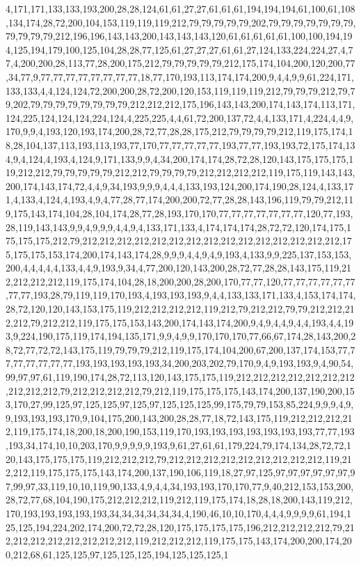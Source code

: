 4,171,171,133,133,193,200,28,28,124,61,61,27,27,61,61,61,194,194,194,61,100,61,108,134,174,28,72,200,104,153,119,119,119,212,79,79,79,79,79,202,79,79,79,79,79,79,79,79,79,79,79,212,196,196,143,143,200,143,143,143,120,61,61,61,61,61,100,100,194,194,125,194,179,100,125,104,28,28,77,125,61,27,27,27,61,61,27,124,133,224,224,27,4,77,4,200,200,28,113,77,28,200,175,212,79,79,79,79,79,212,175,174,104,200,120,200,77,34,77,9,77,77,77,77,77,77,77,77,18,77,170,193,113,174,174,200,9,4,4,9,9,61,224,171,133,133,4,4,124,124,72,200,200,28,72,200,120,153,119,119,119,212,79,79,79,212,79,79,202,79,79,79,79,79,79,79,79,212,212,212,175,196,143,143,200,174,143,174,113,171,124,225,124,124,124,224,124,4,225,225,4,4,61,72,200,137,72,4,4,133,171,4,224,4,4,9,170,9,9,4,193,120,193,174,200,28,72,77,28,28,175,212,79,79,79,79,212,119,175,174,18,28,104,137,113,193,113,193,77,170,77,77,77,77,77,193,77,77,193,193,72,175,174,134,9,4,124,4,193,4,124,9,171,133,9,9,4,34,200,174,174,28,72,28,120,143,175,175,175,119,212,212,79,79,79,79,79,212,212,79,79,79,79,212,212,212,212,119,175,119,143,143,200,174,143,174,72,4,4,9,34,193,9,9,9,4,4,4,133,193,124,200,174,190,28,124,4,133,171,4,133,4,124,4,193,4,9,4,77,28,77,174,200,200,72,77,28,28,143,196,119,79,79,212,119,175,143,174,104,28,104,174,28,77,28,193,170,170,77,77,77,77,77,77,77,120,77,193,28,119,143,143,9,9,4,9,9,9,4,4,9,4,133,171,133,4,174,174,174,28,72,72,120,174,175,175,175,175,212,79,212,212,212,212,212,212,212,212,212,212,212,212,212,212,212,175,175,175,153,174,200,174,143,174,28,9,9,9,4,4,9,4,9,193,4,133,9,9,225,137,153,153,200,4,4,4,4,4,133,4,4,9,193,9,34,4,77,200,120,143,200,28,72,77,28,28,143,175,119,212,212,212,212,119,175,174,104,28,18,200,200,28,200,170,77,77,120,77,77,77,77,77,77,77,77,193,28,79,119,119,170,193,4,193,193,193,9,4,4,133,133,171,133,4,153,174,174,28,72,120,120,143,153,175,119,212,212,212,212,119,212,79,212,212,79,79,212,212,212,212,79,212,212,119,175,175,153,143,200,174,143,174,200,9,4,9,4,4,9,4,4,193,4,4,193,9,224,190,175,119,174,194,135,171,9,9,4,9,9,170,170,170,77,66,67,174,28,143,200,28,72,77,72,72,143,175,119,79,79,79,212,119,175,174,104,200,67,200,137,174,153,77,77,77,77,77,77,77,193,193,193,193,193,34,200,203,202,79,170,9,4,9,193,193,9,4,90,54,99,97,97,61,119,190,174,28,72,113,120,143,175,175,119,212,212,212,212,212,212,212,212,212,212,79,212,212,212,212,79,212,119,175,175,175,143,174,200,137,190,200,153,170,27,99,125,97,125,125,97,125,97,125,125,125,99,175,79,79,153,85,224,9,9,9,4,9,9,193,193,193,170,9,104,175,200,143,200,28,28,77,18,72,143,175,119,212,212,212,212,119,175,174,18,200,18,200,190,153,119,170,193,193,193,193,193,193,193,77,77,193,193,34,174,10,10,203,170,9,9,9,9,9,193,9,61,27,61,61,179,224,79,174,134,28,72,72,120,143,175,175,175,119,212,212,212,79,212,212,212,212,212,212,212,212,212,119,212,212,119,175,175,175,143,174,200,137,190,106,119,18,27,97,125,97,97,97,97,97,97,97,99,97,33,119,10,10,119,90,133,4,9,4,4,34,193,193,170,170,77,9,40,212,153,153,200,28,72,77,68,104,190,175,212,212,212,119,212,119,175,174,18,28,18,200,143,119,212,170,193,193,193,193,193,34,34,34,34,34,34,4,190,46,10,10,170,4,4,4,9,9,9,9,61,194,125,125,194,224,202,174,200,72,72,28,120,175,175,175,175,196,212,212,212,212,79,212,212,212,212,212,212,212,212,119,212,212,212,119,175,175,143,174,200,200,174,200,212,68,61,125,125,97,125,125,125,194,125,125,125,1